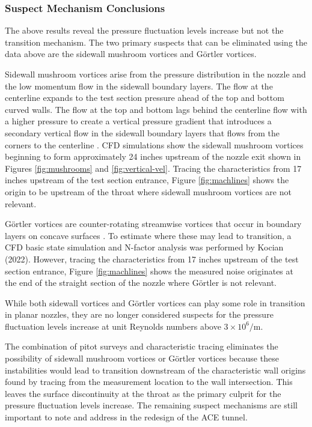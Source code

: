 \subsubsection*{Suspect Mechanism Conclusions}

The above results reveal the pressure fluctuation levels increase but not the transition mechanism. The two primary suspects that can be eliminated using the data above are the sidewall mushroom vortices and Görtler vortices.

Sidewall mushroom vortices arise from the pressure distribution in the nozzle and the low momentum flow in the sidewall boundary layers. The flow at the centerline expands to the test section pressure ahead of the top and bottom curved walls. The flow at the top and bottom lags behind the centerline flow with a higher pressure to create a vertical pressure gradient that introduces a secondary vertical flow in the sidewall boundary layers that flows from the corners to the centerline \cite{sabnis}. CFD simulations show the sidewall mushroom vortices beginning to form approximately 24 inches upstream of the nozzle exit shown in Figures \ref{fig:mushrooms} and \ref{fig:vertical-vel}. Tracing the characteristics from 17 inches upstream of the test section entrance, Figure \ref{fig:machlines} shows the origin to be upstream of the throat where sidewall mushroom vortices are not relevant.

Görtler vortices are counter-rotating streamwise vortices that occur in boundary layers on concave surfaces \cite{saric}. To estimate where these may lead to transition, a CFD basic state simulation and N-factor analysis was performed by Kocian (2022). However, tracing the characteristics from 17 inches upstream of the test section entrance, Figure \ref{fig:machlines} shows the measured noise originates at the end of the straight section of the nozzle where Görtler is not relevant.

While both sidewall vortices and Görtler vortices can play some role in transition in planar nozzles, they are no longer considered suspects for the pressure fluctuation levels increase at unit Reynolds numbers above $3 \times 10^6/\mathrm{m}$.

The combination of pitot surveys and characteristic tracing eliminates the possibility of sidewall mushroom vortices or Görtler vortices because these instabilities would lead to transition downstream of the characteristic wall origins found by tracing from the measurement location to the wall intersection. This leaves the surface discontinuity at the throat as the primary culprit for the pressure fluctuation levels increase. The remaining suspect mechanisms are still important to note and address in the redesign of the ACE tunnel.

